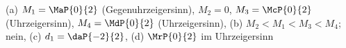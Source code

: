 (a) $M_1 = \MaP{0}{2}$ (Gegenuhrzeigersinn), $M_2 = 0$, $M_3 = \McP{0}{2}$ (Uhrzeigersinn), $M_4 = \MdP{0}{2}$ (Uhrzeigersinn), (b) $M_2 < M_1 < M_3 < M_4$; nein, (c) $d_1 = \daP{-2}{2}$, (d) $\MrP{0}{2}$ im Uhrzeigersinn
